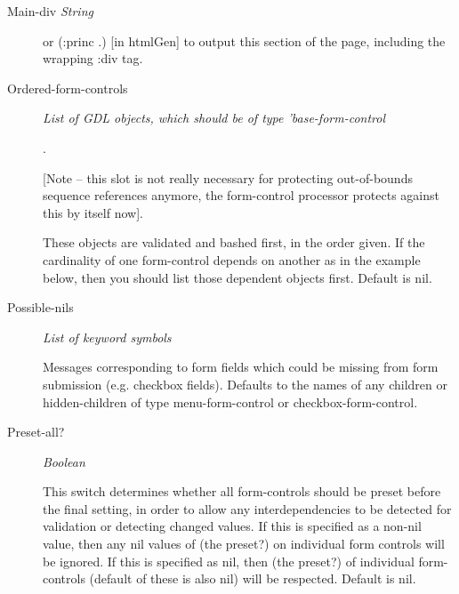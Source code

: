 \documentclass [11pt]{book}
\begin{document}
\begin{itemize}
\begin{description}
\item [Main-div%
\emph{String}

 This should be used with (str .) [in cl-who] or (:princ .)
[in htmlGen] to output this section of the page, including the wrapping :div tag.




\item [Ordered-form-controls]
\emph{List of GDL objects, which should be of type 'base-form-control}

.



[Note -- this slot is not really necessary for protecting out-of-bounds sequence references
anymore, the form-control processor protects against this by itself now].



These objects are validated and bashed first, in the order given. If the cardinality
of one form-control depends on another as in the example below, then you should list
those dependent objects first. Default is nil.




\item [Possible-nils]
\emph{List of keyword symbols}

 Messages corresponding to form fields which could
be missing from form submission (e.g. checkbox fields). Defaults to the names
of any children or hidden-children of type  menu-form-control or
checkbox-form-control.




\item [Preset-all?]
\emph{Boolean}

 This switch determines whether all form-controls should be preset
before the final setting, in order to allow any interdependencies to be detected
for validation or detecting changed values. If this is specified as a non-nil
value, then any nil values of (the preset?) on individual form controls will be
ignored. If this is specified as nil, then (the preset?) of individual
form-controls (default of these is also nil) will be respected. Default is nil.




\end{description}







\end{itemize}
\end{document}

